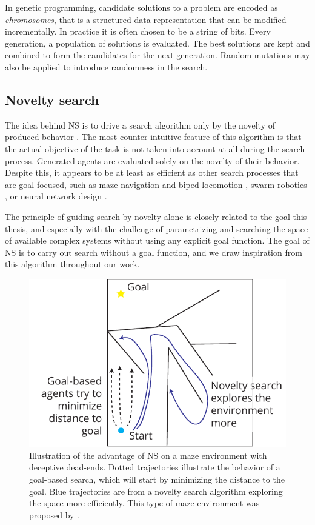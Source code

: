 In genetic programming, candidate solutions to a problem are encoded as
\emph{chromosomes}, that is a structured data representation that can be
modified incrementally. In practice it is often chosen to be a string of bits.
Every generation, a population of solutions is evaluated. The best solutions are
kept and combined to form the candidates for the next generation. Random
mutations may also be applied to introduce randomness in the search.

\subsection{Novelty search}
The idea behind \ac{NS} is to drive a search algorithm only by the novelty of
produced behavior \parencite{lehmanAbandoningObjectivesEvolution2011}. The most
counter-intuitive feature of this algorithm is that the actual objective of the
task is not taken into account at all during the search process. Generated
agents are evaluated solely on the novelty of their behavior. Despite this, it
appears to be at least as efficient as other search processes that are goal
focused, such as maze navigation and biped locomotion
\parencite{lehmanAbandoningObjectivesEvolution2011}, swarm robotics
\parencite{gomesEvolutionSwarmRobotics2013}, or neural network design
\parencite{risiEvolvingPlasticNeural2010}.

The principle of guiding search by novelty alone is closely related to the goal
this thesis, and especially with the challenge of parametrizing and searching
the space of available complex systems without using any explicit goal function.
The goal of \ac{NS} is to carry out search without a goal function, and we draw
inspiration from this algorithm throughout our work.

\begin{figure}[htbp]
  \centering
  \includegraphics[width=.7\linewidth]{figures/novelty_search}
  \caption{Illustration of the advantage of \ac{NS} on a maze environment with
    deceptive dead-ends. Dotted trajectories illustrate the behavior of a
    goal-based search, which will start by minimizing the distance to the goal.
    Blue trajectories are from a novelty search algorithm exploring the space
    more efficiently. This type of maze environment was proposed by
    \textcite{lehmanAbandoningObjectivesEvolution2011}.}
\label{fig:novelty_search}
\end{figure}

